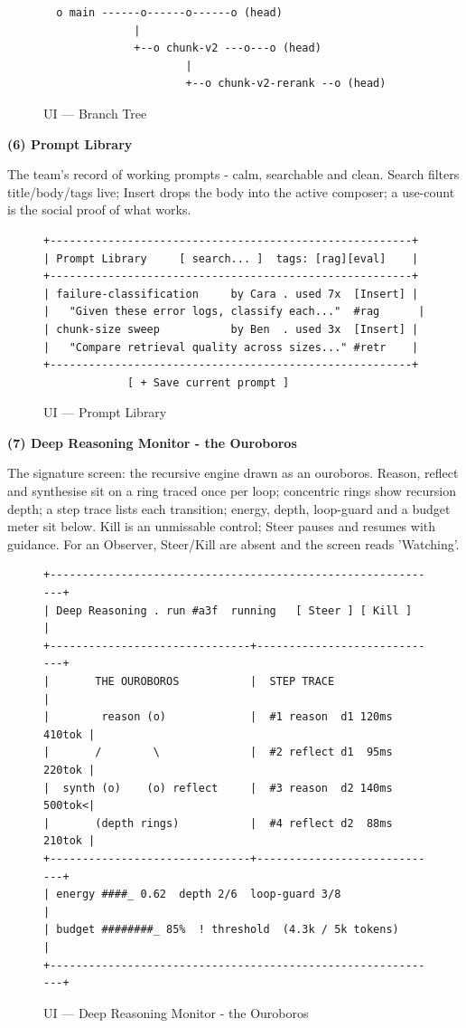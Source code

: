 \documentclass[12pt,a4paper]{report}
\begin{document}
\begin{figure}[H]\centering
\begin{lstlisting}
  o main ------o------o------o (head)
              |
              +--o chunk-v2 ---o---o (head)
                      |
                      +--o chunk-v2-rerank --o (head)
\end{lstlisting}
\caption{UI --- Branch Tree}
\end{figure}

\noindent\textbf{(6) Prompt Library}

The team's record of working prompts - calm, searchable and clean. Search filters title/body/tags live; Insert drops the body into the active composer; a use-count is the social proof of what works.

\begin{figure}[H]\centering
\begin{lstlisting}
+--------------------------------------------------------+
| Prompt Library     [ search... ]  tags: [rag][eval]    |
+--------------------------------------------------------+
| failure-classification     by Cara . used 7x  [Insert] |
|   "Given these error logs, classify each..."  #rag      |
| chunk-size sweep           by Ben  . used 3x  [Insert] |
|   "Compare retrieval quality across sizes..." #retr    |
+--------------------------------------------------------+
             [ + Save current prompt ]
\end{lstlisting}
\caption{UI --- Prompt Library}
\end{figure}

\noindent\textbf{(7) Deep Reasoning Monitor - the Ouroboros}

The signature screen: the recursive engine drawn as an ouroboros. Reason, reflect and synthesise sit on a ring traced once per loop; concentric rings show recursion depth; a step trace lists each transition; energy, depth, loop-guard and a budget meter sit below. Kill is an unmissable control; Steer pauses and resumes with guidance. For an Observer, Steer/Kill are absent and the screen reads 'Watching'.

\begin{figure}[H]\centering
\begin{lstlisting}
+-------------------------------------------------------------+
| Deep Reasoning . run #a3f  running   [ Steer ] [ Kill ]     |
+-------------------------------+-----------------------------+
|       THE OUROBOROS           |  STEP TRACE                 |
|        reason (o)             |  #1 reason  d1 120ms 410tok |
|       /        \              |  #2 reflect d1  95ms 220tok |
|  synth (o)    (o) reflect     |  #3 reason  d2 140ms 500tok<|
|       (depth rings)           |  #4 reflect d2  88ms 210tok |
+-------------------------------+-----------------------------+
| energy ####_ 0.62  depth 2/6  loop-guard 3/8                |
| budget ########_ 85%  ! threshold  (4.3k / 5k tokens)       |
+-------------------------------------------------------------+
\end{lstlisting}
\caption{UI --- Deep Reasoning Monitor - the Ouroboros}
\end{figure}
\end{document}
